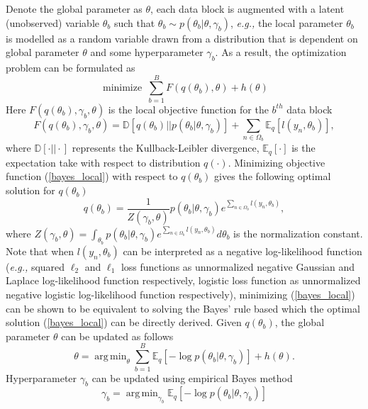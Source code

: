 \documentclass{article}
\DeclareMathOperator*{\argmin}{arg\,min}
\DeclareMathOperator*{\minimize}{minimize}
\newcommand{\eg}[0]{\emph{e.g., }}
\newcommand{\1}[0]{\ensuremath{\boldsymbol{1}}\xspace}
\begin{document}
Denote the global parameter as $\theta$, each data block is augmented with a latent (unobserved) variable $\theta_b$ such that $\theta_b \sim p(\theta_b|\theta, \gamma_b)$, \eg the local parameter $\theta_b$ is modelled as a random variable drawn from a distribution that is dependent on global parameter $\theta$ and some hyperparameter $\gamma_b$. As a result, the optimization problem can be formulated as
\begin{equation}\label{bayes_global}
\minimize ~ \sum_{b=1}^B F(q(\theta_b), \theta) + h(\theta)
\end{equation}
Here $F(q(\theta_b), \gamma_b, \theta)$ is the local objective function for the $b^{th}$ data block
\begin{equation}\label{bayes_local}
F(q(\theta_b), \gamma_b, \theta) = \mathbb{D}[q(\theta_b)||p(\theta_b|\theta, \gamma_b)] + \sum_{n\in\Omega_b}\mathbb{E}_q[l(y_n, \theta_b)],
\end{equation}
where $\mathbb{D}[\cdot||\cdot]$ represents the Kullback-Leibler divergence, $\mathbb{E}_q[\cdot]$ is the expectation take with respect to distribution $q(\cdot)$. Minimizing objective function (\ref{bayes_local}) with respect to $q(\theta_b)$ gives the following optimal solution for $q(\theta_b)$
\begin{equation}\label{bayes_local}
q(\theta_b) = \frac{1}{Z(\gamma_b, \theta)}p(\theta_b|\theta, \gamma_b)e^{\sum_{n\in\Omega_b}l(y_n, \theta_b)},
\end{equation}
where $Z(\gamma_b, \theta) = \int_{\theta_b}p(\theta_b|\theta, \gamma_b)e^{\sum_{n\in\Omega_b}l(y_n, \theta_b)}d\theta_b$ is the normalization constant. Note that when $l(y_n, \theta_b)$ can be interpreted as a negative log-likelihood function (\eg squared $\ell_2$ and $\ell_1$ loss functions as unnormalized negative Gaussian and Laplace log-likelihood function respectively, logistic loss function as unnormalized negative logistic log-likelihood function respectively), minimizing (\ref{bayes_local}) can be shown to be equivalent to solving the Bayes' rule based which the optimal solution (\ref{bayes_local}) can be directly derived. Given $q(\theta_b)$, the global parameter $\theta$ can be updated as follows
\begin{equation*}
\theta = \argmin_{\theta}\sum_{b=1}^B\mathbb{E}_q[-\log p(\theta_b|\theta, \gamma_b)] + h(\theta).
\end{equation*}
Hyperparameter $\gamma_b$ can be updated using empirical Bayes method
\begin{equation*}
\gamma_b = \argmin_{\gamma_b} \mathbb{E}_q[-\log p(\theta_b|\theta, \gamma_b)]
\end{equation*}
\end{document}
